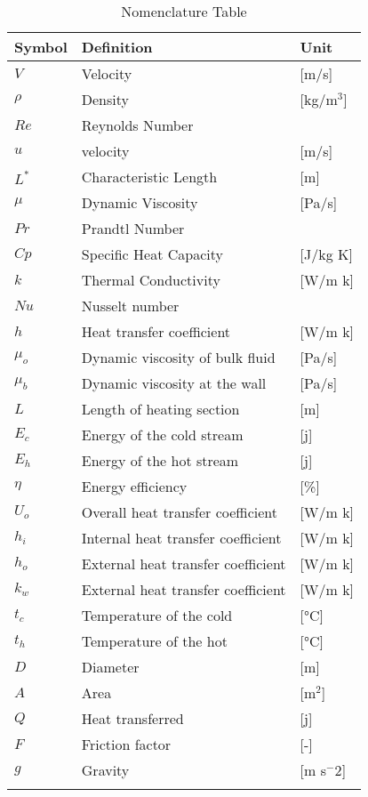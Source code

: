 \section*{}
\begin{longtable}{|p{2.5cm}|p{8cm}|p{2.5cm}|}
    \hline
    Symbol & Definition & Unit \\
    \hline 
    $V$ & Velocity & [m/s] \\
    $\rho$ & Density & [kg/m$^3$] \\
    $ Re$ & Reynolds Number &  \\
    $ u $ & velocity & [m/s] \\
    $L^*$ & Characteristic Length & [m] \\
    $\mu$ & Dynamic Viscosity & [Pa/s] \\
    $Pr$ & Prandtl Number&  \\
    $Cp$ & Specific Heat Capacity & [J/kg K] \\
    $k$ & Thermal Conductivity  & [W/m k] \\
    $Nu$ & Nusselt number &  \\
    $h$ & Heat transfer coefficient  & [W/m k] \\
    $\mu_o$ & Dynamic viscosity of bulk fluid  & [Pa/s] \\
    $\mu_b$ & Dynamic viscosity at the wall & [Pa/s] \\
    $L$ & Length of heating section  & [m] \\
    $E_c$ & Energy of the cold stream & [j] \\
    $E_h$ & Energy of the hot stream & [j] \\
    $\eta $ & Energy efficiency & [\%] \\
    $U_o$ & Overall heat transfer coefficient  & [W/m k] \\
    $h_i$ & Internal heat transfer coefficient  & [W/m k] \\
     $h_o$ & External heat transfer coefficient  & [W/m k] \\
    $k_w$ & External heat transfer coefficient  & [W/m k] \\
    $t_c$ & Temperature of the cold & [°C] \\
    $t_h$ & Temperature of the hot  & [°C] \\
    $D$ & Diameter  & [m] \\
    $A$ & Area  & [m$^2$] \\
    $Q$ & Heat transferred  & [j] \\
    $F$ & Friction factor  &  [-] \\
    $g$ & Gravity & [m s$^-2$] \\
    \hline
    \caption{Nomenclature Table}
\end{longtable}

